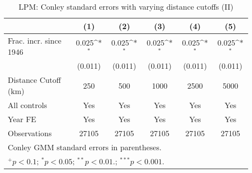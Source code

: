 \begin{table}[htbp]\centering
\def\sym#1{\ifmmode^{#1}\else\(^{#1}\)\fi}
\caption{LPM: Conley standard errors with varying distance cutoffs (II) \label{tab:rob:cnl2}}
\begin{tabular}{l*{5}{c}}
\hline\hline
                    &\multicolumn{1}{c}{(1)}         &\multicolumn{1}{c}{(2)}         &\multicolumn{1}{c}{(3)}         &\multicolumn{1}{c}{(4)}         &\multicolumn{1}{c}{(5)}         \\
\hline
Frac. incr. since 1946&       0.025\sym{*}  &       0.025\sym{*}  &       0.025\sym{*}  &       0.025\sym{*}  &       0.025\sym{*}  \\
                    &     (0.011)         &     (0.011)         &     (0.011)         &     (0.011)         &     (0.011)         \\
\hline
Distance Cutoff (km)&         250         &         500         &        1000         &        2500         &        5000         \\
All controls        &         Yes         &         Yes         &         Yes         &         Yes         &         Yes         \\
Year FE             &         Yes         &         Yes         &         Yes         &         Yes         &         Yes         \\
Observations        &       27105         &       27105         &       27105         &       27105         &       27105         \\
\hline\hline
\multicolumn{6}{l}{\footnotesize Conley GMM standard errors in parentheses.}\\
\multicolumn{6}{l}{\footnotesize $^{+}p<0.1$; $^{*}p<0.05$; $^{**}p<0.01.$; $^{***}p<0.001.$ }\\
\end{tabular}
\end{table}
